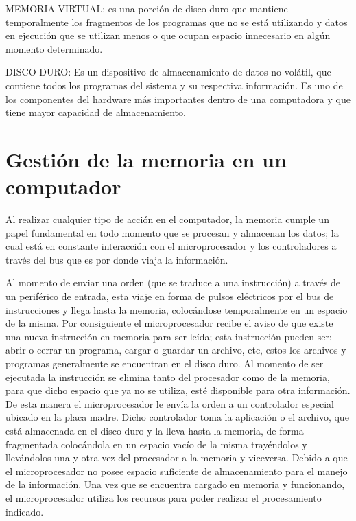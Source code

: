 \documentclass{article}
\begin{document}
\vspace{0.5cm}

MEMORIA VIRTUAL: es una porción de disco duro que mantiene temporalmente los fragmentos de los programas que no se está utilizando y datos en ejecución que se utilizan menos o que ocupan espacio innecesario en algún momento determinado.

\vspace{0.5cm}

DISCO DURO: Es un dispositivo de almacenamiento de datos no volátil, que contiene todos los programas del sistema y su respectiva información. Es uno de los componentes del hardware más importantes dentro de una computadora y que tiene mayor capacidad de almacenamiento.

\vspace{0.5cm}

\section{Gestión de la memoria en un computador} \label{contenido}

Al realizar cualquier tipo de acción en el computador, la memoria cumple un papel fundamental en todo momento que se procesan y almacenan los datos; la cual está en constante interacción con el microprocesador y los controladores a través del bus que es por donde viaja la información.

\vspace{0.5cm}

Al momento de enviar una orden (que se traduce a una instrucción) a través de un periférico de entrada, esta viaje en forma de pulsos eléctricos por el bus de instrucciones y  llega hasta la memoria, colocándose temporalmente en un espacio de la misma. Por consiguiente el microprocesador recibe el aviso de que existe una nueva instrucción en memoria para ser leída; esta instrucción pueden ser: abrir o cerrar un programa, cargar o guardar un archivo, etc, estos los archivos y programas generalmente se encuentran en el disco duro. Al momento de ser ejecutada la instrucción se elimina tanto del procesador como de la memoria, para que dicho espacio que ya no se utiliza, esté disponible para otra información. De esta manera el microprocesador le envía la orden a un controlador especial ubicado en la placa madre. Dicho controlador toma la aplicación o el archivo, que está almacenada en el disco duro y la lleva hasta la memoria, de forma fragmentada colocándola en un espacio vacío de la misma trayéndolos y llevándolos una y otra vez del procesador a la memoria y viceversa. Debido a que el microprocesador no posee espacio suficiente de almacenamiento para el manejo de la información. Una vez que se encuentra cargado en memoria y funcionando, el microprocesador utiliza los  recursos para poder realizar el  procesamiento indicado. 
\end{document}
